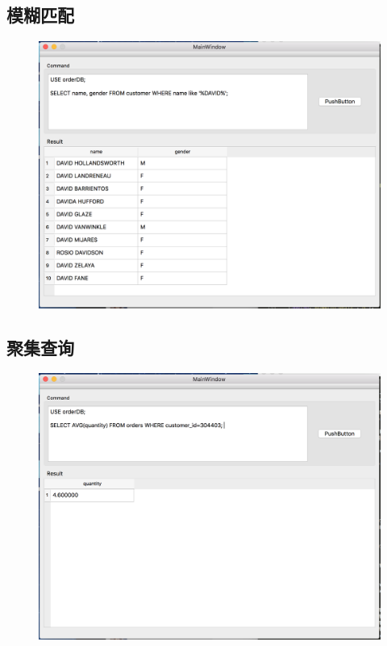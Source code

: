 \subsection{模糊匹配}
\begin{figure}[H]
\centering
\includegraphics[width=4.75in]{Figures/screen_shot/vague.png}
\end{figure}

\subsection{聚集查询}
\begin{figure}[H]
\centering
\includegraphics[width=4.75in]{Figures/screen_shot/group.png}
\end{figure}

